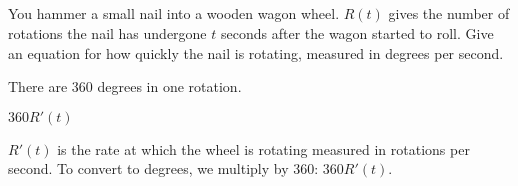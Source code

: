 \subsection*{\Application}

\begin{question} You hammer a small nail into a wooden wagon wheel. $R(t)$ gives the number of rotations the nail has undergone $t$ seconds after the wagon started to roll. Give an equation for how quickly the nail is rotating, measured in degrees per second.
\end{question}
\begin{hint} There are 360 degrees in one rotation.
\end{hint}
\begin{answer} $360R'(t)$
\end{answer}
\begin{solution}
$R'(t)$ is the rate at which the wheel is rotating measured in rotations per second. To convert to degrees, we multiply by 360: $\boxed{360R'(t)}$.
\end{solution}

